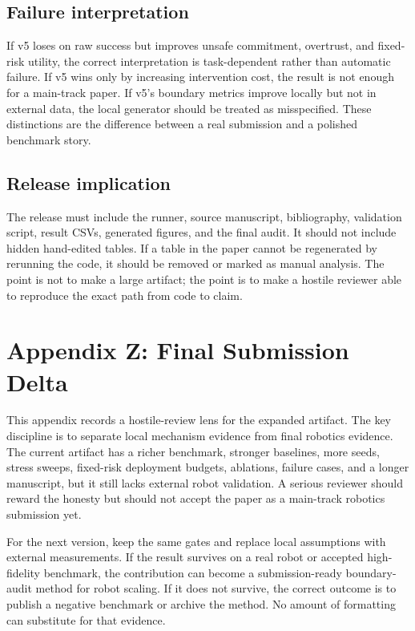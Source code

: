 \documentclass{article}
\begin{document}
\subsection{Failure interpretation}
If v5 loses on raw success but improves unsafe commitment, overtrust, and fixed-risk utility, the correct interpretation is task-dependent rather than automatic failure. If v5 wins only by increasing intervention cost, the result is not enough for a main-track paper. If v5's boundary metrics improve locally but not in external data, the local generator should be treated as misspecified. These distinctions are the difference between a real submission and a polished benchmark story.

\subsection{Release implication}
The release must include the runner, source manuscript, bibliography, validation script, result CSVs, generated figures, and the final audit. It should not include hidden hand-edited tables. If a table in the paper cannot be regenerated by rerunning the code, it should be removed or marked as manual analysis. The point is not to make a large artifact; the point is to make a hostile reviewer able to reproduce the exact path from code to claim.


\section{Appendix Z: Final Submission Delta}
This appendix records a hostile-review lens for the expanded artifact. The key discipline is to separate local mechanism evidence from final robotics evidence. The current artifact has a richer benchmark, stronger baselines, more seeds, stress sweeps, fixed-risk deployment budgets, ablations, failure cases, and a longer manuscript, but it still lacks external robot validation. A serious reviewer should reward the honesty but should not accept the paper as a main-track robotics submission yet.

For the next version, keep the same gates and replace local assumptions with external measurements. If the result survives on a real robot or accepted high-fidelity benchmark, the contribution can become a submission-ready boundary-audit method for robot scaling. If it does not survive, the correct outcome is to publish a negative benchmark or archive the method. No amount of formatting can substitute for that evidence.
\end{document}
